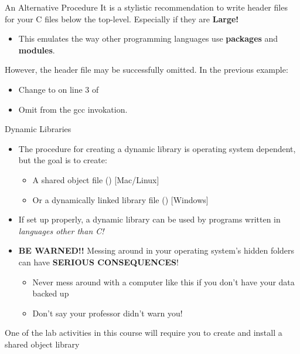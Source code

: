 \documentclass[11pt]{beamer}
\let\OldTexttt\texttt
\renewcommand{\texttt}[1]{\OldTexttt{\color{teal}{#1}}}
\begin{document}
\begin{frame}{An Alternative Procedure}
It is a stylistic recommendation to write header files for your C files below the top-level.  Especially if they are \textbf{\Large{Large!}}
\begin{itemize}
\item This emulates the way other programming languages use \textbf{packages} and \textbf{modules}.
\end{itemize}
However, the header file may be successfully omitted. In the previous example:
\begin{itemize}
\item Change \texttt{mylib.h} to \texttt{mylib.c} on line 3 of \texttt{top.c}
\item Omit \texttt{mylib.c} from the gcc invokation.
\end{itemize}
\end{frame}

\begin{frame}{Dynamic Libraries}
\begin{itemize}
\item The procedure for creating a dynamic library is operating system dependent, but the goal is to create:
\begin{itemize}
\item A shared object file (\texttt{*.so}) [Mac/Linux]
\item Or a dynamically linked library file (\texttt{*.dll}) [Windows]
\end{itemize}
\item If set up properly, a dynamic library can be used by programs written in \emph{languages other than C!}
\item \textbf{BE WARNED!!} Messing around in your operating system's hidden folders can have \textbf{SERIOUS CONSEQUENCES}! 
\begin{itemize}
\item Never mess around with a computer like this if you don't have your data backed up
\item Don't say your professor didn't warn you! 
\end{itemize}
\end{itemize}
One of the lab activities in this course will require you to create and install a shared object library
\end{frame}
\end{document}
